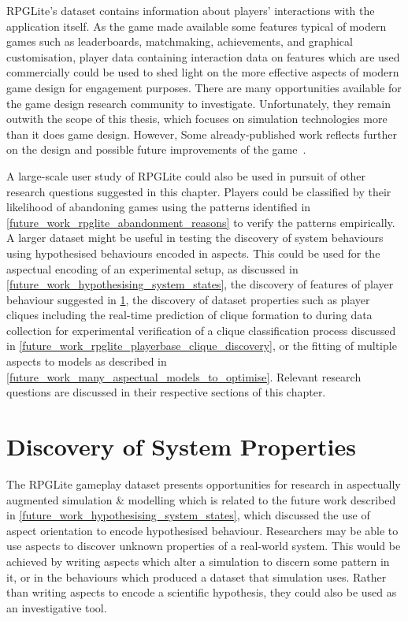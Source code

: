 RPGLite's dataset contains information about players' interactions with the
application itself. As the game made available some features typical of modern
games such as leaderboards, matchmaking, achievements, and graphical
customisation, player data containing interaction data on features which are
used commercially could be used to shed light on the more effective aspects of
modern game design for engagement purposes. There are many opportunities
available for the game design research community to investigate. Unfortunately,
they remain outwith the scope of this thesis, which focuses on simulation
technologies more than it does game design. However, Some already-published work
reflects further on the design and possible future improvements of the
game~\cite{kavanagh2019balancing,RPGLiteLessonsLearned,kavanagh2020,kavanagh2021thesis,kavanagh2021gameplay}.

A large-scale user study of RPGLite could also be used in pursuit of other
research questions suggested in this chapter. Players could be classified by
their likelihood of abandoning games using the patterns identified in
\cref{future_work_rpglite_abandonment_reasons} to verify the patterns
empirically. A larger dataset might be useful in testing the discovery of system
behaviours using hypothesised behaviours encoded in aspects. This could be used
for the aspectual encoding of an experimental setup, as discussed in
\cref{future_work_hypothesising_system_states}, the discovery of features of
player behaviour suggested in
\cref{future_work_discovering_emergent_properties}, the discovery of dataset
properties such as player cliques including the real-time prediction of clique
formation to during data collection for experimental verification of a clique
classification process discussed in
\cref{future_work_rpglite_playerbase_clique_discovery}, or the fitting of
multiple aspects to models as described in
\cref{future_work_many_aspectual_models_to_optimise}. Relevant research
questions are discussed in their respective sections of this chapter.



\section{\AspectOriented{} Discovery of System Properties}
\label{future_work_discovering_emergent_properties}

The RPGLite gameplay dataset presents opportunities for research in aspectually
augmented simulation \& modelling which is related to the future work described
in \cref{future_work_hypothesising_system_states}, which discussed the use of
aspect orientation to encode hypothesised behaviour. Researchers may be able to
use aspects to discover unknown properties of a real-world system. This would be
achieved by writing aspects which alter a simulation to discern some
pattern in it, or in the behaviours which produced a dataset that simulation
uses. Rather than writing aspects to encode a scientific hypothesis, they could
also be used as an investigative tool.

